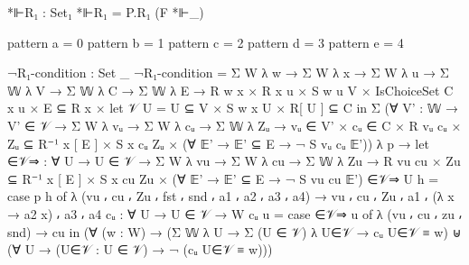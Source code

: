 \begin{spverbatim}
  *⊩R₁ : Set₁
  *⊩R₁ = P.R₁ (F *⊩_)

  pattern a = 0
  pattern b = 1
  pattern c = 2
  pattern d = 3
  pattern e = 4

  ¬R₁-condition : Set _
  ¬R₁-condition = Σ W λ w → Σ W λ x → Σ W λ u → Σ 𝕎 λ V → Σ 𝕎 λ C → Σ 𝕎 λ E →
    R w x × R x u × S w u V × IsChoiceSet C x u × E ⊆ R x ×
      let 𝒱 U = U ⊆ V × S w x U × R[ U ] ⊆ C in
      Σ (∀ {V' : 𝕎} → V' ∈ 𝒱 → Σ W λ vᵤ → Σ W λ cᵤ → Σ 𝕎 λ Zᵤ
      → vᵤ ∈ V' × cᵤ ∈ C × R vᵤ cᵤ × Zᵤ ⊆ R⁻¹ x [ E ] × S x cᵤ Zᵤ
        × (∀ 𝔼' → 𝔼' ⊆ E → ¬ S vᵤ cᵤ 𝔼'))
        λ p →
      let ∈𝒱⇒ : ∀ {U} → U ∈ 𝒱 → Σ W λ vu → Σ W λ cu → Σ 𝕎 λ Zu
              → R vu cu × Zu ⊆ R⁻¹ x [ E ] × S x cu Zu
             × (∀ 𝔼' → 𝔼' ⊆ E → ¬ S vu cu 𝔼')
          ∈𝒱⇒ {U} h = case p h of
            λ { (vu ⸴ cu ⸴ Zu ⸴ fst ⸴ snd ⸴ a1 ⸴ a2 ⸴ a3 ⸴ a4) → vu ⸴ cu ⸴ Zu ⸴ a1 ⸴ (λ {x → a2 x}) ⸴
            a3 ⸴ a4}
          cᵤ : ∀ {U} → U ∈ 𝒱 → W
          cᵤ u = case ∈𝒱⇒ u of λ { (vu ⸴ cu ⸴ zu ⸴ snd) → cu}
     in
     (∀ (w : W) → (Σ 𝕎 λ U → Σ (U ∈ 𝒱) λ U∈𝒱 → cᵤ U∈𝒱 ≡ w)
      ⊎ (∀ {U} → (U∈𝒱 : U ∈ 𝒱) → ¬ (cᵤ U∈𝒱 ≡ w)))


\end{spverbatim}
